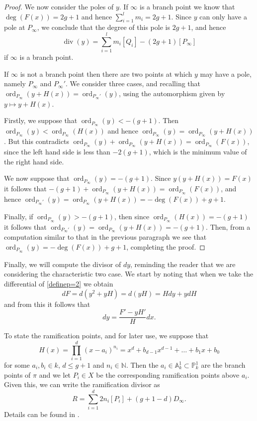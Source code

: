 \documentclass[draft, 11pt]{article} %
\theoremstyle{plain}
\theoremstyle{remark}
\DeclareMathOperator{\ord}{ord}
\DeclareMathOperator{\di}{div}
\begin{document}
\begin{proof}
We now consider the poles of $y$.
If $\infty$ is a branch point we know that $\deg(F(x)) = 2g+1$ and hence $\sum_{i=1}^l m_i = 2g+1$.
Since $y$ can only have a pole at $P_\infty$, we conclude that the degree of this pole is $2g+1$, and hence
\[
\di(y) = \sum_{i=1}^l m_i [Q_i] - (2g+1)[P_\infty]
\]
if $\infty$ is a branch point.

If $\infty$ is not a branch point then there are two points at which $y$ may have a pole, namely $P_\infty$ and $P_\infty'$.
We consider three cases, and recalling that $\ord_{P_\infty}(y + H(x)) = \ord_{P_\infty'}(y)$, using the automorphism given by $y \mapsto y+H(x)$.


Firstly, we suppose that $\ord_{P_\infty}(y) < -(g+1)$.
Then $\ord_{P_\infty}(y) < \ord_{P_\infty}(H(x))$ and hence $ \ord_{P_\infty}(y) = \ord_{P_\infty}(y+H(x))$.
But this contradicts $\ord_{P_\infty}(y) + \ord_{P_\infty}(y+H(x)) = \ord_{P_\infty}(F(x))$, since the left hand side is less than $-2(g+1)$, which is the minimum value of the right hand side.

We now suppose that $\ord_{P_\infty} (y) = -(g+1)$. Since $y(y+H(x)) = F(x)$ it follows that $-(g+1) + \ord_{P_\infty}(y+H(x)) = \ord_{P_\infty}(F(x))$, and hence $\ord_{P_\infty'}(y) = \ord_{P_\infty}(y+H(x)) = -\deg(F(x)) + g + 1$.

Finally, if $\ord_{P_\infty}(y) > -(g+1)$, then since $\ord_{P_\infty}(H(x)) = -(g+1)$ it follows that $\ord_{P_\infty'}(y) = \ord_{P_\infty} (y+H(x)) = -(g+1)$.
Then, from a computation similar to that in the previous paragraph we see that $\ord_{P_\infty}(y) = -\deg(F(x)) + g +1$, completing the proof.
\end{proof}



Finally, we will compute the divisor of $dy$, reminding the reader that we are considering the characteristic two case.
We start by noting that when we take the differential of \eqref{definep=2} we obtain
\[
dF = d\left(y^2 + yH \right) = d(yH) = Hdy + ydH
\]
and from this it follows that
\begin{equation}\label{divdyp=2}
dy = \frac{F'-yH'}{H}dx.
\end{equation}


To state the ramification points, and for later use, we suppose that 
\begin{equation*}
H(x) = \prod_{i=1}^d (x-a_i)^{n_i} = x^d + b_{d-1}x^{d-1} + \ldots + b_1x + b_0
\end{equation*}
for some $a_i, b_i \in  k$, $d \leq g+1$ and $n_i \in \mathbb N$.
Then the $a_i \in \mathbb A_k^1 \subset \mathbb P_k^1$ are the branch points of $\pi$ and we let $P_i \in X$ be the corresponding ramification points above $a_i$.
Given this, we can write the ramification divisor as
\[
R = \sum_{i=1}^d 2n_i[P_i] + (g+1-d)D_\infty.
\]
Details can be found in \cite[\S 6]{faithfulaction}.
\end{document}
